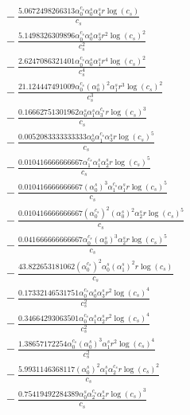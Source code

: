 \documentclass[10pt]{article}
\begin{document}
\begin{align*}
&{}  - \frac{5.0672498266313 \alpha_{0}^{c_s} \alpha_{0}^s \alpha_{4}^s r \log{\left(c_{s} \right)}}{c_{s}} \\
&{}  - \frac{5.1498326309896 \alpha_{0}^{c_s} \alpha_{0}^s \alpha_{3}^s r^{2} \log{\left(c_{s} \right)}^{2}}{c_{s}^{2}} \\
&{}  - \frac{2.6247086321401 \alpha_{0}^{c_s} \alpha_{0}^s \alpha_{1}^s r^{4} \log{\left(c_{s} \right)}^{2}}{c_{s}^{4}} \\
&{}  - \frac{21.124447491009 \alpha_{0}^{c_s} \left(\alpha_{0}^s\right)^{2} \alpha_{1}^s r^{3} \log{\left(c_{s} \right)}^{2}}{c_{s}^{3}} \\
&{}  - \frac{0.16662751301962 \alpha_{0}^s \alpha_{1}^s \alpha_{3}^{c_s} r \log{\left(c_{s} \right)}^{3}}{c_{s}} \\
&{}  - \frac{0.0052083333333333 \alpha_{0}^s \alpha_{1}^{c_s} \alpha_{3}^s r \log{\left(c_{s} \right)}^{5}}{c_{s}} \\
&{}  - \frac{0.010416666666667 \alpha_{1}^{c_s} \alpha_{1}^s \alpha_{2}^s r \log{\left(c_{s} \right)}^{5}}{c_{s}} \\
&{}  - \frac{0.010416666666667 \left(\alpha_{0}^s\right)^{3} \alpha_{1}^{c_s} \alpha_{1}^s r \log{\left(c_{s} \right)}^{5}}{c_{s}} \\
&{}  - \frac{0.010416666666667 \left(\alpha_{0}^{c_s}\right)^{2} \left(\alpha_{0}^s\right)^{2} \alpha_{2}^s r \log{\left(c_{s} \right)}^{5}}{c_{s}} \\
&{}  - \frac{0.041666666666667 \alpha_{0}^{c_s} \left(\alpha_{0}^s\right)^{3} \alpha_{2}^s r \log{\left(c_{s} \right)}^{5}}{c_{s}} \\
&{}  - \frac{43.822653181062 \left(\alpha_{0}^{c_s}\right)^{2} \alpha_{0}^s \left(\alpha_{1}^s\right)^{2} r \log{\left(c_{s} \right)}}{c_{s}} \\
&{}  - \frac{0.17332146531751 \alpha_{0}^{c_s} \alpha_{0}^s \alpha_{3}^s r^{2} \log{\left(c_{s} \right)}^{4}}{c_{s}^{2}} \\
&{}  - \frac{0.34664293063501 \alpha_{0}^{c_s} \alpha_{1}^s \alpha_{2}^s r^{2} \log{\left(c_{s} \right)}^{4}}{c_{s}^{2}} \\
&{}  - \frac{1.38657172254 \alpha_{0}^{c_s} \left(\alpha_{0}^s\right)^{3} \alpha_{1}^s r^{2} \log{\left(c_{s} \right)}^{4}}{c_{s}^{2}} \\
&{}  - \frac{5.9931146368117 \left(\alpha_{0}^s\right)^{2} \alpha_{1}^s \alpha_{2}^{c_s} r \log{\left(c_{s} \right)}^{2}}{c_{s}} \\
&{}  - \frac{0.75419492284389 \alpha_{0}^s \alpha_{2}^{c_s} \alpha_{2}^s r \log{\left(c_{s} \right)}^{3}}{c_{s}} \\

\end{align*}
\end{document}
